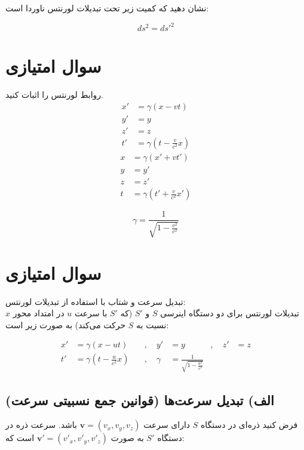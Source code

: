 \documentclass[a4paper,18pt]{article}
\begin{document}
	نشان دهید که کمیت زیر تحت تبدیلات لورنتس ناوردا است:
	
	\[
	ds^2=ds'^2
	\]
	
	\section{سوال امتیازی}
	روابط لورنتس را اثبات کنید.
	\[
	\boxed{
		\begin{aligned}
			x' &= \gamma (x - v t) \\
			y' &= y \\
			z' &= z \\
			t' &= \gamma \left( t - \frac{v}{c^2} x \right)
		\end{aligned}
	}
	\]
	\[
	\boxed{
		\begin{aligned}
			x &= \gamma (x' + v t') \\
			y &= y' \\
			z &= z' \\
			t &= \gamma \left( t' + \frac{v}{c^2} x' \right)
		\end{aligned}
	}
	\]
	
	
	
	\[
	\gamma = \frac{1}{\sqrt{1 - \frac{v^2}{c^2}}}
	\]
	\section{سوال امتیازی}
	تبدیل سرعت و شتاب با استفاده از تبدیلات لورنتس:
	\\
	
	تبدیلات لورنتس برای دو دستگاه اینرسی \( S \) و \( S' \) (که \( S' \) با سرعت \( u \) در امتداد محور \( x \) نسبت به \( S \) حرکت می‌کند) به صورت زیر است:
	
	\[
	\begin{aligned}
		x' &= \gamma (x - u t) \quad &, \quad y' &= y \quad &, \quad z' &= z \\
		t' &= \gamma \left( t - \frac{u}{c^2} x \right) \quad &, \quad \gamma &= \frac{1}{\sqrt{1 - \frac{u^2}{c^2}}}
	\end{aligned}
	\]
	
	\subsection*{الف) تبدیل سرعت‌ها (قوانین جمع نسبیتی سرعت)}
	
	فرض کنید ذره‌ای در دستگاه \( S \) دارای سرعت \( \mathbf{v} = (v_x, v_y, v_z) \) باشد. سرعت ذره در دستگاه \( S' \) به صورت \( \mathbf{v}' = (v'_x, v'_y, v'_z) \) است که:
	
\end{document}
